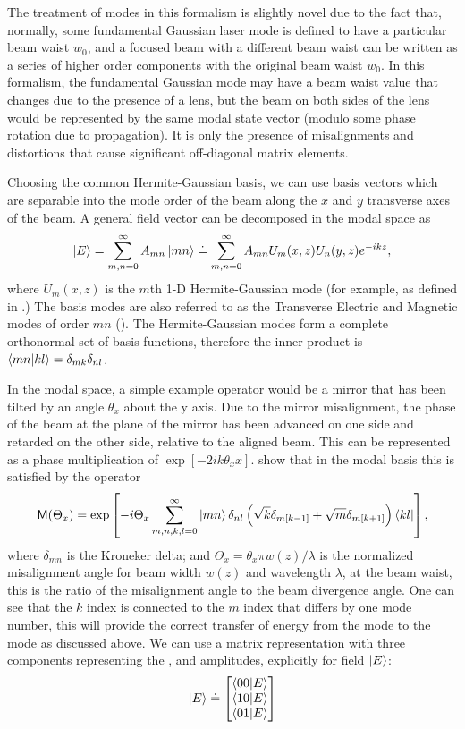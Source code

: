 The treatment of modes in this formalism is slightly novel due to the fact that, normally, some fundamental Gaussian laser mode is defined to have a particular beam waist $w_0$, and a focused beam with a different beam waist can be written as a series of higher order components with the original beam waist $w_0$. %
In this formalism, the fundamental Gaussian mode may have a beam waist value that changes due to the presence of a lens, but the beam on both sides of the lens would be represented by the same modal state vector (modulo some phase rotation due to propagation). %
It is only the presence of misalignments and distortions that cause significant off-diagonal matrix elements.

Choosing the common Hermite-Gaussian basis, we can use basis vectors which are separable into the mode order of the beam along the $x$ and $y$ transverse axes of the beam. %
A general field vector can be decomposed in the modal space as
\begin{equation}
\left| E \right> = \sum_{m,n=0}^\infty A_{mn}\left| mn \right>\doteq\sum_{m,n=0}^\infty A_{mn}U_m(x,z)U_n(y,z)e^{-ikz},
\end{equation}
where $U_m(x,z)$ is the $m$th 1-D Hermite-Gaussian mode (for example, as defined in \citet{Siegman}.) The basis modes are also referred to as the Transverse Electric and Magnetic modes of order $mn$ (). %
The Hermite-Gaussian modes form a complete orthonormal set of basis functions, therefore the inner product is $\inprod{mn}{kl}=\delta_{mk}\delta_{nl}$.

In the modal space, a simple example operator would be a mirror that has been tilted by an angle $\theta_x$ about the y axis. %
Due to the mirror misalignment, the phase of the beam at the plane of the mirror has been advanced on one side and retarded on the other side, relative to the aligned beam. %
This can be represented as a phase multiplication of $\exp[-2ik\theta_x x]$. %
\citet{Hefetz:97} show that in the modal basis this is satisfied by the operator
\begin{equation}
\mathsf{M}(\Theta_x) = \exp\left[ -i\Theta_x\sum_{m,n,k,l=0}^\infty \left| mn \right> \delta_{nl} \left( \sqrt k \delta_{m[k-1]}+\sqrt m \delta_{m[k+1]} \right) \left< kl \right|\right],
\end{equation}
where $\delta_{mn}$ is the Kroneker delta; and $\Theta_x = \theta_x \pi w(z)/\lambda$ is the normalized misalignment angle for beam width $w(z)$ and wavelength $\lambda$, at the beam waist, this is the ratio of the misalignment angle to the beam divergence angle. %
One can see that the $k$ index is connected to the $m$ index that differs by one mode number, this will provide the correct transfer of energy from the  mode to the  mode as discussed above. %
We can use a matrix representation with three components representing the ,  and  amplitudes, explicitly for field $\left| E \right>$:
\begin{equation}
\vect{E} \doteq \ms \inprod{00}{E} \\ \inprod{10}{E} \\ \inprod{01}{E} \me
\end{equation}

